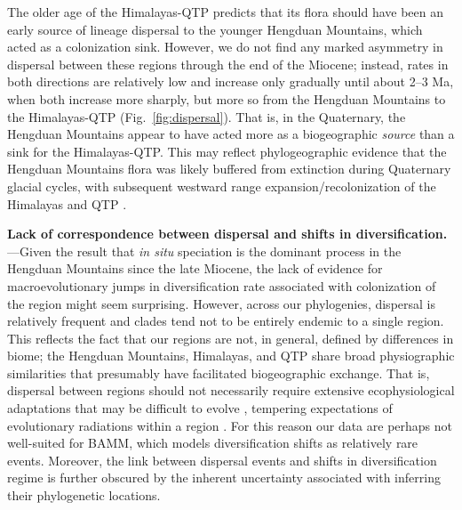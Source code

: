 
The older age of the Himalayas-QTP predicts that its flora should have been an early source of lineage dispersal to the younger Hengduan Mountains, which acted as a colonization sink. However, we do not find any marked asymmetry in dispersal between these regions through the end of the Miocene; instead, rates in both directions are relatively low and increase only gradually until about 2--3 Ma, when both increase more sharply, but more so from the Hengduan Mountains to the Himalayas-QTP (Fig.~\ref{fig:dispersal}). That is, in the Quaternary, the Hengduan Mountains appear to have acted more as a biogeographic \textit{source} than a sink for the Himalayas-QTP. This may reflect phylogeographic evidence that the Hengduan Mountains flora was likely buffered from extinction during Quaternary glacial cycles, with subsequent westward range expansion/recolonization of the Himalayas and QTP \citep[e.g.,][]{WangBS2011,CunY2010}. 


\textbf{Lack of correspondence between dispersal and shifts in diversification.}---Given the result that \textit{in situ} speciation is the dominant process in the Hengduan Mountains since the late Miocene, the lack of evidence for macroevolutionary jumps in diversification rate associated with colonization of the region might seem surprising. However, across our phylogenies, dispersal is relatively frequent and clades tend not to be entirely endemic to a single region. This reflects the fact that our regions are not, in general, defined by differences in biome; the Hengduan Mountains, Himalayas, and QTP share broad physiographic similarities that presumably have facilitated biogeographic exchange. That is, dispersal between regions should not necessarily require extensive ecophysiological adaptations that may be difficult to evolve \citep{Donoghue2014}, tempering expectations of evolutionary radiations within a region \citep[cf.][]{Hughes2006}. For this reason our data are perhaps not well-suited for BAMM, which models diversification shifts as relatively rare events. Moreover, the link between dispersal events and shifts in diversification regime is further obscured by the inherent uncertainty associated with inferring their phylogenetic locations.

